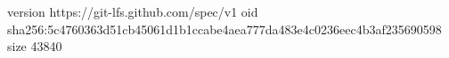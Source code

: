 version https://git-lfs.github.com/spec/v1
oid sha256:5c4760363d51cb45061d1b1ccabe4aea777da483e4c0236eec4b3af235690598
size 43840

